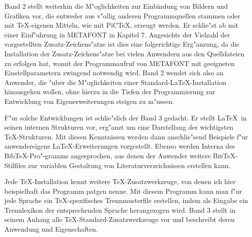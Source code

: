 \documentclass{article}
\begin{document}
Band 2 stellt weiterhin die M"oglichkeiten zur Einbindung von Bildern und
Grafiken vor, die entweder aus v"ollig anderen Programmquellen stammen oder
mit \TeX-eigenen Mitteln, wie mit PiC\TeX, erzeugt werden.
Er schlie"st ab mit einer Einf"uhrung in METAFONT in Kapitel 7. Angesichts der
Vielzahl der vorgestellten Zusatz-Zeichens"atze ist dies eine folgerichtige
Erg"anzung, da die Installation der Zusatz-Zeichens"atze bei vielen Anwendern
aus den Quelldateien zu erfolgen hat, womit der Programmaufruf von METAFONT
mit geeigneten Einstellparametern zwingend notwendig wird.
Band 2 wendet sich also an Anwender, die "uber die M"oglichkeiten 
einer Standard-\LaTeX-Installation hinausgehen wollen, ohne hierzu
in die Tiefen der Programmierung zur Entwicklung von Eigenerweiterungen
steigen zu m"ussen.

F"ur solche Entwicklungen ist schlie"slich der Band 3 gedacht. Er stellt
\LaTeX\ in seinen internen Strukturen vor, erg"anzt um eine Darstellung
der wichtigsten \TeX-Strukturen. Mit diesen Kenntnissen werden dann
anschlie"send Beispiele f"ur anwendereigene \LaTeX-Erweiterungen vorgestellt.
Ebenso werden Interna des Bib\TeX-Pro"-gramms angesprochen, aus denen
der Anwender weitere \textsc{Bib}\TeX-Stilfiles zur variablen Gestaltung
von Literaturverzeichnissen erstellen kann.

Jede \TeX-Installation kennt weitere  \TeX-Zusatzwerkzeuge, von denen ich hier
beispielhaft das Programm patgen nenne. Mit diesem Programm kann man
f"ur jede Sprache ein \TeX-spezifisches Trennmusterfile erstellen,
indem als Eingabe ein Trennlexikon der entsprechenden Sprache herangezogen
wird. Band 3 stellt in seinem Anhang alle \TeX-Standard-Zusatzwerkzeuge vor und
beschreibt deren Anwendung und Eigenschaften.
\end{document}

